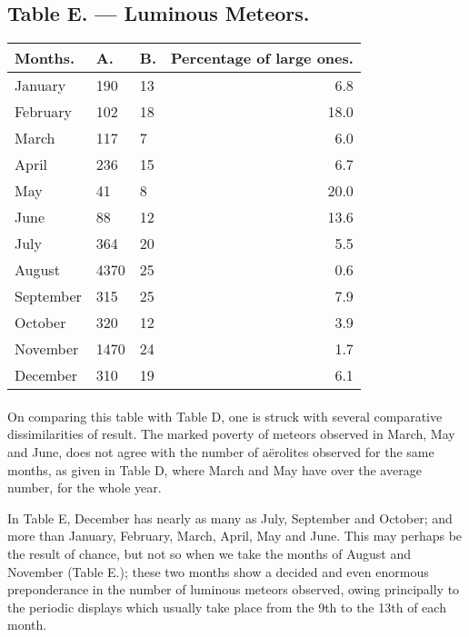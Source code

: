 \documentclass[a4paper, 12pt, oneside]{article}
\begin{document}
\subsection{Table E. --- Luminous Meteors.}
\begin{table}[H]
    \centering
    \Fontauri
    \begin{tabular}{|l|l|l|r|}
    \hline
         Months. & A. & B. & Percentage of large ones. \\ \hline
        January & 190 & 13 & 6.8 \\ \hline
        February & 102 & 18 & 18.0 \\ \hline
        March & 117 & 7 & 6.0 \\ \hline
        April & 236 & 15 & 6.7 \\ \hline
        May & 41 & 8 & 20.0 \\ \hline
        June & 88 & 12 & 13.6 \\ \hline
        July & 364 & 20 & 5.5 \\ \hline
        August & 4370 & 25 & 0.6 \\ \hline
        September & 315 & 25 & 7.9 \\ \hline
        October & 320 & 12 & 3.9 \\ \hline
        November & 1470 & 24 & 1.7 \\ \hline
        December & 310 & 19 & 6.1 \\ \hline
    \end{tabular}
\end{table}
\paragraph{}
On comparing this table with Table D, one is struck with several comparative dissimilarities of result. The marked poverty of meteors observed in March, May and June, does not agree with the number of aërolites observed for the same months, as given in Table D, where March and May have over the average number, for the whole year.

In Table E, December has nearly as many as July, September and October; and more than January, February, March, April, May and June. This may perhaps be the result of chance, but not so when we take the months of August and November (Table E.); these two months show a decided and even enormous preponderance in the number of luminous meteors observed, owing principally to the periodic displays which usually take place from the 9th to the 13th of each month.
\end{document}
